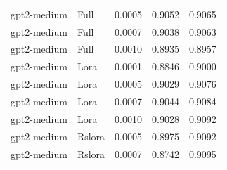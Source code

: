 \begin{tabular}{llrrr}
gpt2-medium & Full & 0.0005 & 0.9052 & 0.9065 \\
gpt2-medium & Full & 0.0007 & 0.9038 & 0.9063 \\
gpt2-medium & Full & 0.0010 & 0.8935 & 0.8957 \\
gpt2-medium & Lora & 0.0001 & 0.8846 & 0.9000 \\
gpt2-medium & Lora & 0.0005 & 0.9029 & 0.9076 \\
gpt2-medium & Lora & 0.0007 & 0.9044 & 0.9084 \\
gpt2-medium & Lora & 0.0010 & 0.9028 & 0.9092 \\
gpt2-medium & Rslora & 0.0005 & 0.8975 & 0.9092 \\
gpt2-medium & Rslora & 0.0007 & 0.8742 & 0.9095 \\
\bottomrule
\end{tabular}
